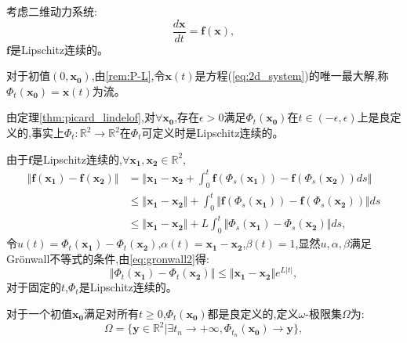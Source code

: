 考虑二维动力系统:
\begin{equation}\label{eq:2d_system}
    \frac{d\mathbf{x}}{dt}=\mathbf{f}(\mathbf{x}),
\end{equation}
$\mathbf{f}$是Lipschitz连续的。
\begin{defn}[流]
    对于初值$(0,\mathbf{x_0})$,由\ref{rem:P-L},令$\mathbf{x}(t)$是方程(\ref{eq:2d_system})的唯一最大解,称$\Phi_t(\mathbf{x_0})=\mathbf{x}(t)$为流。
\end{defn}
\begin{rem}
    由定理\ref{thm:picard_lindelof},对$\forall \mathbf{x_0}$,存在$\epsilon>0$满足$\Phi_t(\mathbf{x_0})$在$t\in (-\epsilon,\epsilon)$上是良定义的,事实上$\Phi_t:\mathbb{R}^2\to\mathbb{R}^2$在$\Phi_t$可定义时是Lipschitz连续的。
\end{rem}
\begin{pf}
    由于$\mathbf{f}$是Lipschitz连续的,$\forall \mathbf{x_1},\mathbf{x_2}\in \mathbb{R}^2$,
    \begin{equation}
        \begin{aligned}
            \Vert \mathbf{f}(\mathbf{x_1})-\mathbf{f}(\mathbf{x_2})\Vert & = \Vert \mathbf{x_1}-\mathbf{x_2}+\int_0^t\mathbf{f}(\Phi_s(\mathbf{x_1}))-\mathbf{f}(\Phi_s(\mathbf{x_2}))ds\Vert \\
            &\leq \Vert \mathbf{x_1}-\mathbf{x_2}\Vert+\int_0^t\Vert \mathbf{f}(\Phi_s(\mathbf{x_1}))-\mathbf{f}(\Phi_s(\mathbf{x_2}))\Vert ds\\
            &\leq \Vert \mathbf{x_1}-\mathbf{x_2}\Vert+L\int_0^t\Vert \Phi_s(\mathbf{x_1})-\Phi_s(\mathbf{x_2})\Vert ds,
        \end{aligned}
    \end{equation}
    令$u(t)=\Phi_t(\mathbf{x_1})-\Phi_t(\mathbf{x_2})$,$\alpha(t)= \mathbf{x_1}-\mathbf{x_2}$,$\beta(t)=1$,显然$u,\alpha,\beta$满足Grönwall不等式的条件,由\ref{eq:gronwall2}得:
    \begin{equation}
        \Vert \Phi_t(\mathbf{x_1})-\Phi_t(\mathbf{x_2})\Vert\leq \Vert \mathbf{x_1}-\mathbf{x_2}\Vert e^{L|t|},
    \end{equation}
    对于固定的$t$,$\Phi_t$是Lipschitz连续的。
\end{pf}
\begin{defn}

    对于一个初值$\mathbf{x_0}$满足对所有$t\geq 0$,$\Phi_t(\mathbf{x_0})$都是良定义的,定义$\omega$-极限集$\Omega$为:
    \begin{equation}
        \Omega=\{\mathbf{y}\in \mathbb{R}^2|\exists t_n\to +\infty,\Phi_{t_n}(\mathbf{x_0})\to \mathbf{y}\},
    \end{equation}
\end{defn}
